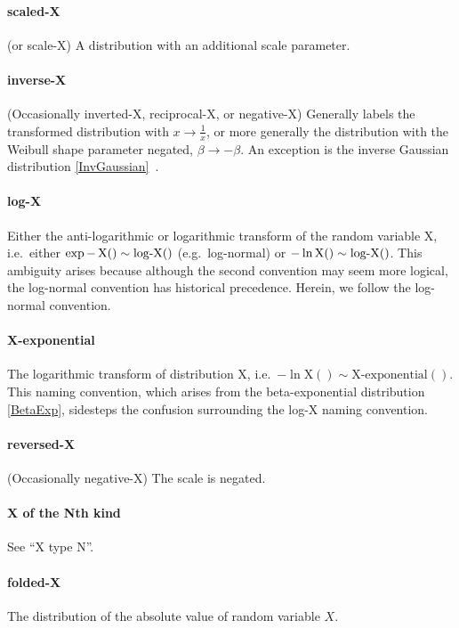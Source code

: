 \paragraph*{scaled-X} (or scale-X) A distribution with an additional scale parameter. 

\paragraph*{inverse-X} (Occasionally inverted-X, reciprocal-X, or negative-X) Generally labels the transformed distribution with $x\to\tfrac{1}{x}$, or more generally the distribution with the Weibull shape parameter negated, $\beta\to-\beta$. An exception is the inverse Gaussian distribution \eqref{InvGaussian}~\cite{Johnson1994}. 

\paragraph*{log-X}   Either the anti-logarithmic or logarithmic transform of the random variable X, i.e.\ either  $\exp - \operatorname{X}() \sim \operatorname{log-X}()$ (e.g.\ log-normal)  or $-\ln \text{X}() \sim \operatorname{log-X}()$.  This ambiguity arises because although the second convention may seem more logical, the log-normal convention has historical precedence. Herein, we follow the log-normal convention. 
\label{log-transform-name}

\paragraph*{X-exponential}  The logarithmic transform of distribution X, i.e.\ $-\ln \text{X}() \sim \text{X-exponential}()$. This naming convention, which arises from the beta-exponential distribution \eqref{BetaExp}, sidesteps the confusion surrounding the log-X naming convention.


\paragraph*{reversed-X} (Occasionally negative-X)  The scale is negated. 
\paragraph*{X of the Nth kind} See ``X type N''.

\paragraph*{folded-X} The distribution of the absolute value of random variable $X$. %

